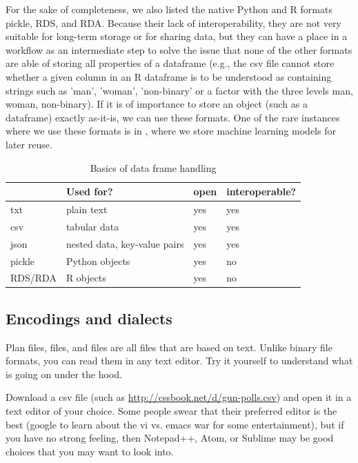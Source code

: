 For the sake of completeness, we also listed the native Python and R formats pickle, RDS, and RDA. Because their lack of interoperability, they are not very suitable for long-term storage or for sharing data, but they can have a place in a workflow as an intermediate step to solve the issue that none of the other formats are able of storing all properties of a dataframe (e.g., the csv file cannot store whether a given column in an R dataframe is to be understood as containing strings such as 'man', 'woman', 'non-binary' or a factor with the three levels man, woman, non-binary). If it is of importance to store an object (such as a dataframe) exactly as-it-is, we can use these formats. One of the rare instances where we use these formats is in , where we store machine learning models for later reuse.

\begin{table}[]
\caption{Basics of data frame handling \label{tab:fileformats}}{%
\begin{tabular}{@{}llll@{}}
\toprule
        & Used for?             & open   & interoperable?\\ \midrule
txt     & plain text            &yes & yes            \\
csv     & tabular data          & yes & yes            \\
json    & nested data, key-value pairs   & yes & yes             \\ 
pickle  & Python objects        & yes & no     \\ 
RDS/RDA & R objects             & yes & no \\ \bottomrule
\end{tabular}}{}
\end{table}


\subsection{Encodings and dialects}
\label{sec:encodings}
Plan  files,  files, and  files are all files that are based on text. Unlike binary file formats, you can read them in any text editor. Try it yourself to understand what is going on under the hood. 

Download a csv file (such as \url{http://cssbook.net/d/gun-polls.csv})
and open it in a text editor of your choice. Some people swear that their preferred editor is the best (google to learn about the vi vs. emacs war for some entertainment), but if you have no strong feeling, then Notepad++, Atom, or Sublime may be good choices that you may want to look into.

